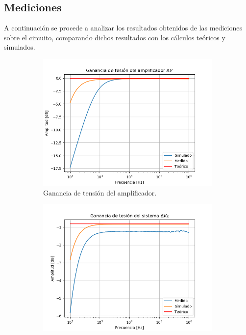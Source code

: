 \subsection{Mediciones}
A continuación se procede a analizar los resultados obtenidos de las mediciones sobre el circuito, comparando dichos resultados con los cálculos teóricos y simulados.
\begin{figure}[H]
\centering
\begin{subfigure}{.49\textwidth}
\centering
	\includegraphics[width=\textwidth]{Imagenes/Av.png}
	\caption{Ganancia de tensión del amplificador.}
	\label{fig:av}
\end{subfigure}
\begin{subfigure}{.49\textwidth}
\centering
	\includegraphics[width=\textwidth]{Imagenes/Avs.png}

\end{subfigure}
\end{figure}
